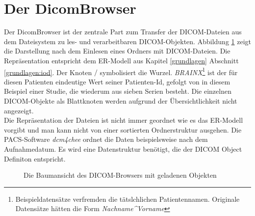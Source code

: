 \section{Der DicomBrowser}
Der DicomBrowser ist der zentrale Part zum Transfer der DICOM-Dateien aus dem Dateisystem zu les- und verarbeitbaren DICOM-Objekten. Abbildung \ref{dicombrowser} zeigt die Darstellung nach dem Einlesen eines Ordners mit DICOM-Dateien. Die Repräsentation entspricht dem ER-Modell aus Kapitel \ref{grundlagen} Abschnitt \ref{grundlagen:iod}. Der Knoten $/$ symbolisiert die Wurzel. \textit{BRAINX}\footnote{Beispieldatensätze verfremden die tätslchlichen Patientennamen. Originale Datensätze hätten die Form \textit{Nachname\^{}Vorname}} ist der für diesen Patienten eindeutige Wert seiner Patienten-Id, gefolgt von in diesem Beispiel einer Studie, die wiederum aus sieben Serien besteht. Die einzelnen DICOM-Objekte als Blattknoten werden aufgrund der Übersichtlichkeit nicht angezeigt.\\
Die Repräsentation der Dateien ist nicht immer geordnet wie es das ER-Modell vorgibt und man kann nicht von einer sortierten Ordnerstruktur ausgehen. Die PACS-Software \textit{dcm4chee} ordnet die Daten beispielsweise nach dem Aufnahmedatum. Es wird eine Datenstruktur benötigt, die der DICOM Object Definiton entspricht.

\begin{figure}[htbp]
  \vspace{0.5cm}
  \centering
   \caption{Die Baumansicht des DICOM-Browsers mit geladenen Objekten}
  \label{dicombrowser}
  \vspace{0.5cm}
\end{figure}

